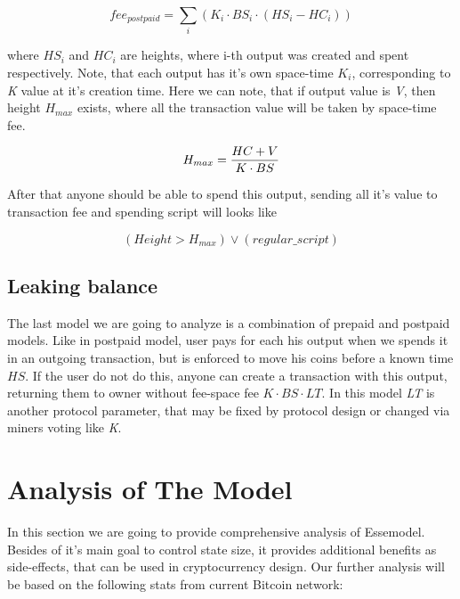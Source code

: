 \documentclass[]{article}   %
\newcommand{\esse}{Esse}
\begin{document}
\begin{equation}
fee_{postpaid} = \sum_i{(K_i \cdot BS_i \cdot (HS_i - HC_i))}
\end{equation}

where \textit{$HS_i$} and \textit{$HC_i$} are heights, where i-th output was created and spent respectively. Note, that each output has it's own space-time \textit{$K_i$}, corresponding to \textit{K} value at it's creation time. Here we can note, that if output value is \textit{V}, then height \textit{$H_{max}$} exists, where all the transaction value will be taken by space-time fee.

\begin{equation}
H_{max} = {{HC + V} \over {K \cdot BS}}
\end{equation}

After that anyone should be able to spend this output, sending all it's value to transaction fee and spending script will looks like

\begin{equation}
(Height > H_{max}) \lor (regular\_script)
\end{equation}

\subsection{Leaking balance}

The last model we are going to analyze is a combination of prepaid and postpaid models. Like in postpaid model, user pays for each his output when we spends it in an outgoing transaction, but is enforced to move his coins before a known time \textit{$HS$}. If the user do not do this, anyone can create a transaction with this output, returning them to owner without fee-space fee ${K \cdot BS \cdot LT}$. In this model \textit{LT} is another protocol parameter, that may be fixed by protocol design or changed via miners voting like \textit{K}.

\section{Analysis of The Model}
\label{sec:analysis}

In this section we are going to provide comprehensive analysis of \esse model. Besides of it's main goal to control state size, it provides additional benefits as side-effects, that can be used in cryptocurrency design. Our further analysis will be based on the following stats from current Bitcoin network:
\end{document}
